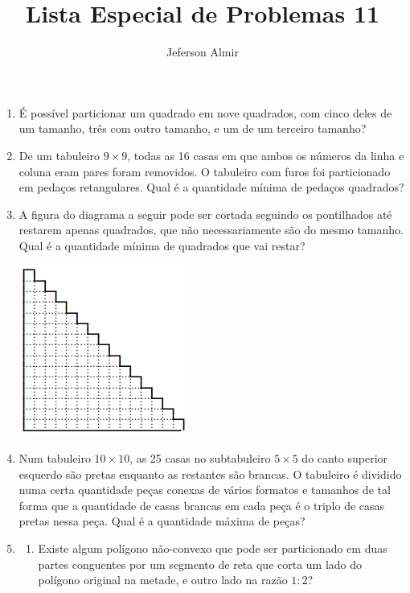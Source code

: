 \documentclass{article}
\title{Lista Especial de Problemas 11}
\author{Jeferson Almir}
\date{}
\begin{document}
\maketitle

\begin{enumerate}
    \item É possível particionar um quadrado em nove quadrados,
    com cinco deles de um tamanho,
    três com outro tamanho,
    e um de um terceiro tamanho?
    
    \item De um tabuleiro $9\times 9$,
    todas as 16 casas em que ambos os números da linha e coluna eram pares foram removidos.
    O tabuleiro com furos foi particionado em pedaços retangulares.
    Qual é a quantidade mínima de pedaços quadrados?
    
    \item A figura do diagrama a seguir pode ser cortada seguindo os pontilhados até restarem apenas quadrados,
    que não necessariamente são do mesmo tamanho.
    Qual é a quantidade mínima de quadrados que vai restar?
    
	\begin{center}
		\includegraphics[scale=1]{img/img_11_01}
	\end{center}
    
    \item Num tabuleiro $10\times 10$,
    as 25 casas no subtabuleiro $5\times 5$ do canto superior esquerdo
    são pretas enquanto as restantes são brancas.
    O tabuleiro é dividido numa certa quantidade peças conexas
    de vários formatos e tamanhos
    de tal forma que a quantidade de casas brancas em cada peça é o triplo de casas pretas nessa peça.
    Qual é a quantidade máxima de peças?
    
    \item \begin{enumerate}
    \item Existe algum polígono não-convexo
    que pode ser particionado em duas partes conguentes por um segmento de reta
    que corta um lado do polígono original na metade,
    e outro lado na razão $1:2$?
    

\end{enumerate}
\end{enumerate}
\end{document}
